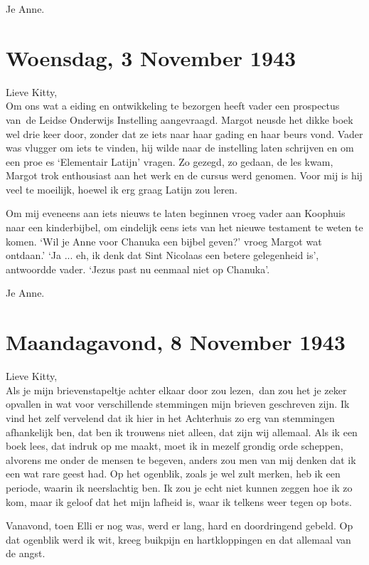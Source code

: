 \documentclass{book}
\begin{document}
Je Anne.

\chapter{Woensdag, 3 November 1943}

Lieve Kitty,\\Om ons wat a eiding en ontwikkeling te bezorgen heeft
vader een prospectus van~de Leidse Onderwijs Instelling aangevraagd.
Margot neusde het dikke boek wel drie keer door, zonder dat ze iets naar
haar gading en haar beurs vond. Vader was vlugger om iets te vinden, hij
wilde naar de instelling laten schrijven en om een proe es `Elementair
Latijn' vragen. Zo gezegd, zo gedaan, de les kwam, Margot trok
enthousiast aan het werk en de cursus werd genomen. Voor mij is hij veel
te moeilijk, hoewel ik erg graag Latijn zou leren.

Om mij eveneens aan iets nieuws te laten beginnen vroeg vader aan
Koophuis naar een kinderbijbel, om eindelijk eens iets van het nieuwe
testament te weten te komen. `Wil je Anne voor Chanuka een bijbel
geven?' vroeg Margot wat ontdaan.' `Ja ... eh, ik denk dat Sint Nicolaas
een betere gelegenheid is', antwoordde vader. `Jezus past nu eenmaal
niet op Chanuka'.

Je Anne.

\chapter{Maandagavond, 8 November 1943}

Lieve Kitty,\\Als je mijn brievenstapeltje achter elkaar door zou
lezen,~dan zou het je zeker opvallen in wat voor verschillende
stemmingen mijn brieven geschreven zijn. Ik vind het zelf vervelend dat
ik hier in het Achterhuis zo erg van stemmingen afhankelijk ben, dat ben
ik trouwens niet alleen, dat zijn wij allemaal. Als ik een boek lees,
dat indruk op me maakt, moet ik in mezelf grondig orde scheppen,
alvorens me onder de mensen te begeven, anders zou men van mij denken
dat ik een wat rare geest had. Op het ogenblik, zoals je wel zult
merken, heb ik een periode, waarin ik neerslachtig ben. Ik zou je echt
niet kunnen zeggen hoe ik zo kom, maar ik geloof dat het mijn lafheid
is, waar ik telkens weer tegen op bots.

Vanavond, toen Elli er nog was, werd er lang, hard en doordringend
gebeld. Op dat ogenblik werd ik wit, kreeg buikpijn en hartkloppingen en
dat allemaal van de angst.
\end{document}
